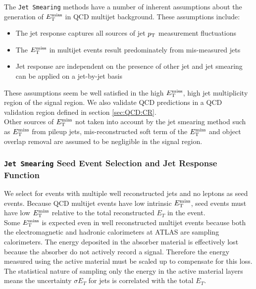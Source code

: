 \indent The {\tt Jet Smearing} methods have a number of inherent assumptions about the generation of $E_{\mathrm{T}}^{\mathrm{miss}}$ in QCD multijet background.  These assumptions include: \\

\begin{itemize}
\item The jet response captures all sources of jet $p_{\mathrm{T}}$ measurement fluctuations
\item The $E_{\mathrm{T}}^{\mathrm{miss}}$ in multijet events result predominately from mis-measured jets
\item Jet response are independent on the presence of other jet and jet smearing can be applied on a jet-by-jet basis
\end{itemize}

\indent These assumptions seem be well satisfied in the high $E_{\mathrm{T}}^{\mathrm{miss}}$, high jet multiplicity region of the signal region.   We also validate QCD predictions in a QCD validation region defined in section \ref{sec:QCD:CR}.\\

\indent Other sources of $E_{\mathrm{T}}^{\mathrm{miss}}$ not taken into account by the jet smearing method such as $E_{\mathrm{T}}^{\mathrm{miss}}$ from pileup jets, mis-reconstructed soft term of the $E_{\mathrm{T}}^{\mathrm{miss}}$ and object overlap removal are assumed to be negligible in the signal region. \\

\subsubsection{{\tt Jet Smearing} Seed Event Selection and Jet Response Function}

\indent We select for events with multiple well reconstructed jets and no leptons as seed events.  Because QCD multijet events have low intrinsic $E_{\mathrm{T}}^{\mathrm{miss}}$, seed events must have low $E_{\mathrm{T}}^{\mathrm{miss}}$ relative to the total reconstructed $E_T$ in the event. \\ 

\indent Some $E_{\mathrm{T}}^{\mathrm{miss}}$ is expected even in well reconstructed multijet events because both the electromagnetic and hadronic calorimeters at ATLAS are sampling calorimeters.  The energy deposited in the absorber material is effectively lost because the absorber do not actively record a signal.  Therefore the energy measured using the active material must be scaled up to compensate for this loss.  The statistical nature of sampling only the energy in the active material layers means the uncertainty $\sigma E_T$ for jets is correlated with the total $E_T$.   \\

